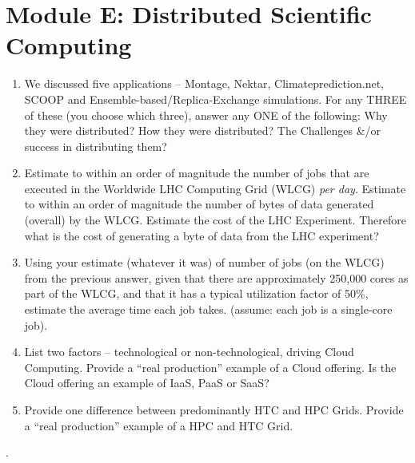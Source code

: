 \documentclass[oneside]{article}
\newcommand{\answerspace}{\vskip 6.5cm}
\begin{document}
\newpage

\section*{Module E: Distributed Scientific Computing}


\begin{enumerate}

\item We discussed five applications -- Montage, Nektar,
  Climateprediction.net, SCOOP and Ensemble-based/Replica-Exchange
  simulations. For any THREE of these (you choose which three), answer
  any ONE of the following: Why they were distributed? How they were
  distributed? The Challenges \&/or success in distributing them?

\answerspace

\item Estimate to within an order of magnitude the number of jobs that
  are executed in the Worldwide LHC Computing Grid (WLCG) {\it per
    day}. Estimate to within an order of magnitude the number of bytes
  of data generated (overall) by the WLCG. Estimate the cost of the
  LHC Experiment. Therefore what is the cost of generating a byte of
  data from the LHC experiment?

\answerspace

\item Using your estimate (whatever it was) of number of jobs (on
   the WLCG) from the previous answer, given that there are
   approximately 250,000 cores as part of the WLCG, and that it has a
   typical utilization factor of 50\%, estimate the average time each
   job takes. (assume: each job is a single-core job).
\answerspace

\item List two factors -- technological or non-technological, driving
  Cloud Computing. Provide a ``real production'' example of a Cloud
  offering. Is the Cloud offering an example of IaaS, PaaS or SaaS?
  \answerspace

\item Provide one difference between predominantly HTC and
  HPC Grids.  Provide a ``real production'' example of a HPC and HTC
  Grid.

\answerspace

\end{enumerate}

\newpage


.\vskip 10cm
{}
\end{document}
